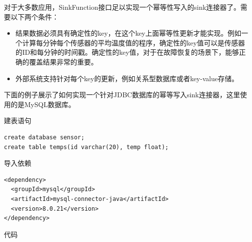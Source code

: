 \documentclass[cn,11pt,chinese]{elegantbook}
\begin{document}
对于大多数应用，SinkFunction接口足以实现一个幂等性写入的sink连接器了。需要以下两个条件：

\begin{itemize}
    \item 结果数据必须具有确定性的key，在这个key上面幂等性更新才能实现。例如一个计算每分钟每个传感器的平均温度值的程序，确定性的key值可以是传感器的ID和每分钟的时间戳。确定性的key值，对于在故障恢复的场景下，能够正确的覆盖结果非常的重要。
    \item 外部系统支持针对每个key的更新，例如关系型数据库或者key-value存储。
\end{itemize}

下面的例子展示了如何实现一个针对JDBC数据库的幂等写入sink连接器，这里使用的是MySQL数据库。

建表语句

\begin{verbatim}
create database sensor;
create table temps(id varchar(20), temp float);
\end{verbatim}

导入依赖

\begin{verbatim}
<dependency>
  <groupId>mysql</groupId>
  <artifactId>mysql-connector-java</artifactId>
  <version>8.0.21</version>
</dependency>
\end{verbatim}

代码
\end{document}
